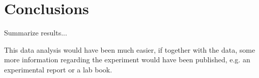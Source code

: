 \documentclass[aps,prx,reprint,amsmath,amssymb,superscriptaddress,showpacs]{revtex4-1}
\begin{document}
\section{Conclusions}

Summarize results...

This data analysis would have been much easier, if together with the data, some more information regarding the experiment would have been published, e.g. an experimental report or a lab book.






\end{document}
